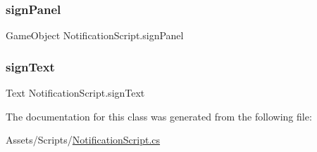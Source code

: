 \subsubsection{\texorpdfstring{sign\+Panel}{signPanel}}
{\footnotesize\ttfamily Game\+Object Notification\+Script.\+sign\+Panel}

\mbox{\label{classNotificationScript_ac14b3bfa5562f9d974ccf25117106ae1}} 
\subsubsection{\texorpdfstring{sign\+Text}{signText}}
{\footnotesize\ttfamily Text Notification\+Script.\+sign\+Text}



The documentation for this class was generated from the following file\+:\begin{DoxyCompactItemize}
\item 
Assets/\+Scripts/\hyperlink{NotificationScript_8cs}{Notification\+Script.\+cs}\end{DoxyCompactItemize}
